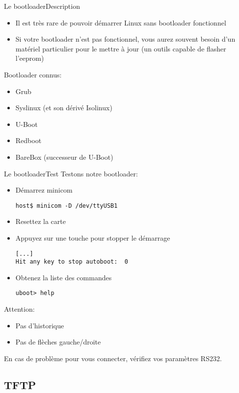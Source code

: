 \begin{frame}{Le bootloader}{Description}
  \begin{itemize}
    \item Il  est très  rare de pouvoir  démarrer Linux  sans bootloader
    fonctionnel
    \item Si votre bootloader  n'est pas fonctionnel, vous aurez souvent
    besoin d'un matériel particulier pour  le mettre à jour (un outils
    capable de flasher l'eeprom)
  \end{itemize}
  Bootloader connus:
  \begin{itemize}
    \item Grub
    \item Syslinux (et son dérivé Isolinux)
    \item U-Boot
    \item Redboot
    \item BareBox (successeur de U-Boot)
  \end{itemize}
\end{frame}

\begin{frame}[fragile=singleslide]{Le bootloader}{Test}
  Testons notre bootloader:
  \begin{itemize}
    \item Démarrez minicom
    \begin{lstlisting}
host$ minicom -D /dev/ttyUSB1
    \end{lstlisting}
  \item Resettez la carte
  \item Appuyez sur une touche pour stopper le démarrage
    \begin{lstlisting}
[...]
Hit any key to stop autoboot:  0
    \end{lstlisting}
  \item Obtenez la liste des commandes
    \begin{lstlisting}
uboot> help
    \end{lstlisting}
  \end{itemize}
  Attention:
  \begin{itemize}
  \item Pas d'historique
  \item Pas de flèches gauche/droite
  \end{itemize}
  En  cas de  problème pour  vous connecter,  vérifiez  vos paramètres
  RS232.
\end{frame}

\subsection{TFTP}

